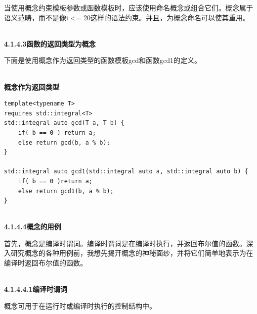 \begin{tcolorbox}[breakable,enhanced jigsaw,colback=blue!5!white,colframe=blue!75!black,title={避免在requires子句中使用编译时谓词}]
当使用概念约束模板参数或函数模板时，应该使用命名概念或组合它们。概念属于语义范畴，而不是像i <= 20这样的语法约束。并且，为概念命名可以使其重用。
\end{tcolorbox}

\hspace*{\fill} \\ %
\noindent
\textbf{4.1.4.3\hspace{0.2cm}函数的返回类型为概念}

下面是使用概念作为返回类型的函数模板gcd和函数gcd1的定义。

\hspace*{\fill} \\ %
\noindent
\textbf{概念作为返回类型}
\begin{lstlisting}[style=styleCXX]
template<typename T>
requires std::integral<T>
std::integral auto gcd(T a, T b) {
	if( b == 0 ) return a;
	else return gcd(b, a % b);
}

std::integral auto gcd1(std::integral auto a, std::integral auto b) {
	if( b == 0 )return a;
	else return gcd1(b, a % b);
}
\end{lstlisting}

\hspace*{\fill} \\ %
\noindent
\textbf{4.1.4.4\hspace{0.2cm}概念的用例}

首先，概念是编译时谓词。编译时谓词是在编译时执行，并返回布尔值的函数。深入研究概念的各种用例前，我想先揭开概念的神秘面纱，并将它们简单地表示为在编译时返回布尔值的函数。

\hspace*{\fill} \\ %
\noindent
\textbf{4.1.4.4.1\hspace{0.2cm}编译时谓词}

概念可用于在运行时或编译时执行的控制结构中。

